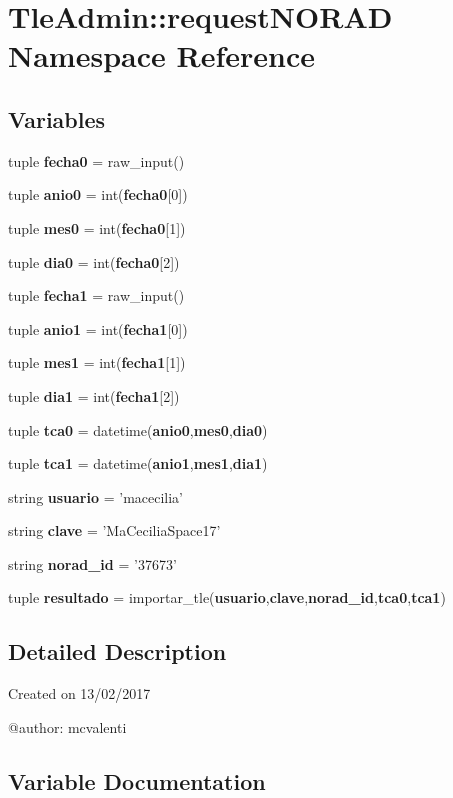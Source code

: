 \section{\-Tle\-Admin\-:\-:request\-N\-O\-R\-A\-D \-Namespace \-Reference}
\label{namespace_tle_admin_1_1request_n_o_r_a_d}
\subsection*{\-Variables}
\begin{DoxyCompactItemize}
\item 
tuple {\bf fecha0} = raw\-\_\-input()
\item 
tuple {\bf anio0} = int({\bf fecha0}[0])
\item 
tuple {\bf mes0} = int({\bf fecha0}[1])
\item 
tuple {\bf dia0} = int({\bf fecha0}[2])
\item 
tuple {\bf fecha1} = raw\-\_\-input()
\item 
tuple {\bf anio1} = int({\bf fecha1}[0])
\item 
tuple {\bf mes1} = int({\bf fecha1}[1])
\item 
tuple {\bf dia1} = int({\bf fecha1}[2])
\item 
tuple {\bf tca0} = datetime({\bf anio0},{\bf mes0},{\bf dia0})
\item 
tuple {\bf tca1} = datetime({\bf anio1},{\bf mes1},{\bf dia1})
\item 
string {\bf usuario} = 'macecilia'
\item 
string {\bf clave} = '\-Ma\-Cecilia\-Space17'
\item 
string {\bf norad\-\_\-id} = '37673'
\item 
tuple {\bf resultado} = importar\-\_\-tle({\bf usuario},{\bf clave},{\bf norad\-\_\-id},{\bf tca0},{\bf tca1})
\end{DoxyCompactItemize}


\subsection{\-Detailed \-Description}
\begin{DoxyVerb}
Created on 13/02/2017

@author: mcvalenti
\end{DoxyVerb}
 

\subsection{\-Variable \-Documentation}

